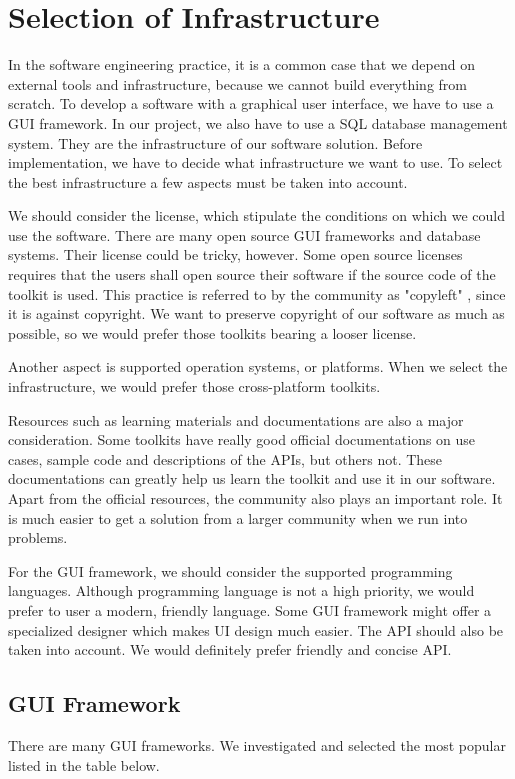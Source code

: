 \chapter{Selection of Infrastructure}
In the software engineering practice, it is a common case that we depend on external tools and infrastructure, because we cannot build everything from scratch. To develop a software with a graphical user interface, we have to use a GUI framework. In our project, we also have to use a SQL database management system. They are the infrastructure of our software solution. Before implementation, we have to decide what infrastructure we want to use. To select the best infrastructure a few aspects must be taken into account. 

We should consider the license, which stipulate the conditions on which we could use the software. There are many open source GUI frameworks and database systems. Their license could be tricky, however. Some open source licenses requires that the users shall open source their software if the source code of the toolkit is used. This practice is referred to by the community as "copyleft" , since it is against copyright. We want to preserve copyright of our software as much as possible, so we would prefer those toolkits bearing a looser license. 

Another aspect is supported operation systems, or platforms. When we select the infrastructure, we would prefer those cross-platform toolkits.

Resources such as learning materials and documentations are also a major consideration. Some toolkits have really good official documentations on use cases, sample code and descriptions of the APIs, but others not. These documentations can greatly help us learn the toolkit and use it in our software. Apart from the official resources, the community also plays an important role. It is much easier to get a solution from a larger community when we run into problems.

For the GUI framework, we should consider the supported programming languages. Although programming language is not a high priority, we would prefer to user a modern, friendly language. Some GUI framework might offer a specialized designer which makes UI design much easier. The API should also be taken into account. We would definitely prefer friendly and concise API.

\section{GUI Framework}
There are many GUI frameworks. We investigated and selected the most popular listed in the table below.

